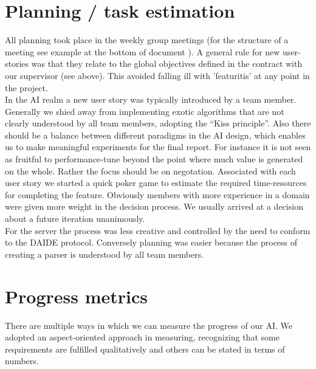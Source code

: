 \documentclass[pdftex,11pt,a4paper]{report}
\begin{document}
\section{Planning / task estimation}
All planning took place in the weekly group meetings (for the
structure of a meeting see example at the bottom of document ). A
general rule for new user-stories was that they relate to the global
objectives defined in the contract with our supervisor (see
above). This avoided falling ill with 'featuritis' at any point in the
project.  \\ In the AI realm a new user story was typically introduced
by a team member. Generally we shied away from implementing exotic
algorithms that are not clearly understood by all team members,
adopting the ``Kiss principle''. Also there should be a balance
between different paradigms in the AI design, which enables us to make
meaningful experiments for the final report. For instance it is not
seen as fruitful to performance-tune beyond the point where much value
is generated on the whole. Rather the focus should be on
negotation. Associated with each user story we started a quick poker
game to estimate the required time-resources for completing the
feature. Obviously members with more experience in a domain were given
more weight in the decision process.  We usually arrived at a decision
about a future iteration unanimously.  \\ For the server the process
was less creative and controlled by the need to conform to the DAIDE
protocol. Conversely planning was easier because the process of
creating a parser is understood by all team members.

\section{Progress metrics}
There are multiple ways in which we can measure the progress of our
AI.  We adopted an aspect-oriented approach in measuring, recognizing
that some requirements are fulfilled qualitatively and others can be
stated in terms of numbers.
\end{document}
